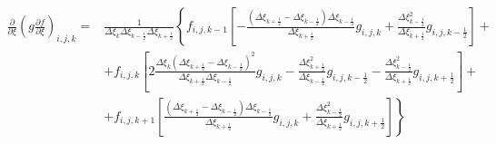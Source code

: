 \documentclass[12pt, a4paper]{article}
\newcommand\onehalf{\frac{1}{2}} %
\begin{document}
\begin{equation*}
    \begin{split}
        \left.
            \frac
                {\partial}
                {\partial \xi}
            \left(
                g
                \frac
                    {\partial f}
                    {\partial \xi}
            \right)
        \right._{i, j, k}
        = &
        \frac
            {1}
            {
                \Delta \xi_{k}
                \Delta \xi_{k - \onehalf}
                \Delta \xi_{k + \onehalf}
            }
        \left\{
            f_{i, j, k - 1}
            \left[
                -
                \frac
                    {
                        \left(
                            \Delta \xi_{k + \onehalf}
                            -
                            \Delta \xi_{k - \onehalf}
                        \right)
                        \Delta \xi_{k - \onehalf}
                    }
                    {\Delta \xi_{k + \onehalf}}
                g_{i, j, k}
                +
                \frac
                    {\Delta \xi^2_{k - \onehalf}}
                    {\Delta \xi_{k + \onehalf}}
                g_{i, j, k - \onehalf}
            \right]
            +
        \right.
        \\ &
        \left.
            +
            f_{i, j, k}
            \left[
                2
                \frac
                    {
                        \Delta \xi_{k}
                        {\left(
                            \Delta \xi_{k + \onehalf}
                            -
                            \Delta \xi_{k - \onehalf}
                        \right)}^2
                    }
                    {
                        \Delta \xi_{k + \onehalf}
                        \Delta \xi_{k - \onehalf}
                    }
                g_{i, j, k}
                -
                \frac
                    {\Delta \xi^2_{k + \onehalf}}
                    {\Delta \xi_{k - \onehalf}}
                g_{i, j, k - \onehalf}
                -
                \frac
                    {\Delta \xi^2_{k - \onehalf}}
                    {\Delta \xi_{k + \onehalf}}
                g_{i, j, k + \onehalf}
            \right]
            +
        \right.
        \\ &
        \left.
            +
            f_{i, j, k + 1}
            \left[
                \frac
                    {
                        \left(
                            \Delta \xi_{k + \onehalf}
                            -
                            \Delta \xi_{k - \onehalf}
                        \right)
                        \Delta \xi_{k - \onehalf}
                    }
                    {\Delta \xi_{k + \onehalf}}
                g_{i, j, k}
                +
                \frac
                    {\Delta \xi^2_{k - \onehalf}}
                    {\Delta \xi_{k + \onehalf}}
                g_{i, j, k + \onehalf}
            \right]
        \right\}
    \end{split}
\end{equation*}
\end{document}
